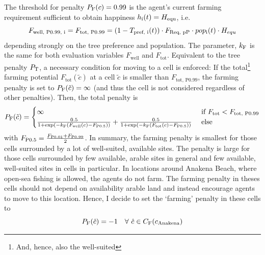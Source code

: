 The threshold for penalty $P_{\rm F}(c)=0.99$ is the agent's current farming requirement sufficient to obtain happiness $h_{\rm i}(t) = H_{\rm equ}$, i.e.\
\begin{equation} 
F_\text{well, P0.99, i} = F_\text{tot, P0.99} = (1-T_\text{pref, i}(t))\cdot F_\text{Req, pP}\cdot pop_{\rm i}(t) \cdot H_{equ}
\end{equation}
depending strongly on the tree preference and population.
The parameter, $k_{\rm F}$ is the same for both evaluation variables $F_\text{well} $ and $F_\text{tot}$.
Equivalent to the tree penalty $P_{\rm T}$, a necessary condition for moving to a cell is enforced:
 If the total\footnote{And, hence, also the well-suited} farming potential $F_\text{tot}(\tilde{c})$ at a cell $\tilde{c}$ is smaller than $F_\text{tot, P0.99}$, the farming penalty is set to $P_{\rm F}(\tilde{c}) = \infty$ (and thus the cell is not considered regardless of other penalties).
Then, the total penalty is 
\begin{equation}
P_{\rm F} (\tilde{c}) = 
\begin{cases} 
\infty & \text{ if } F_\text{tot} < F_\text{tot, P0.99}\\
\frac{0.5}{1+\exp\left( - k_{\rm F} (F_\text{well}(c)-F_\text{P0.5}) \right)} + \frac{0.5}{1+\exp\left( - k_{\rm F} (F_\text{tot}(c)-F_\text{P0.5}) \right)} & \text{ else}
\end{cases}
\end{equation}
with $F_\text{P0.5} = \frac{F_{\rm P0.01}+F_{\rm P0.99}}{2}$.
In summary, the farming penalty is smallest for those cells surrounded by a lot of well-suited, available sites.
The penalty is large for those cells surrounded by few available, arable sites in general and few available, well-suited sites in cells in particular.
In locations around Anakena Beach, where open-sea fishing is allowed, the agents do not farm. 
The farming penalty in theses cells should not depend on availability arable land and instead encourage agents to move to this location.
Hence, I decide to set the `farming' penalty in these cells to
\begin{equation}
	P_{\rm F}(\hat{c}) = - 1 %
	 \quad \forall \  \hat{c} \in C_\text{F}(c_{\rm Anakena})
\end{equation}


